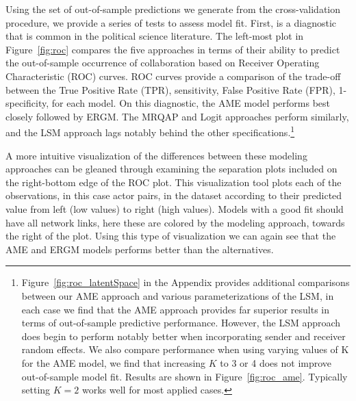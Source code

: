 \documentclass[12pt,pdflatex]{elsarticle}
\begin{document}
Using the set of out-of-sample predictions we generate from the cross-validation procedure, we provide a series of tests to assess model fit. First, is a diagnostic that is common in the political science literature. The left-most plot in Figure~\ref{fig:roc} compares the five approaches in terms of their ability to predict the out-of-sample occurrence of collaboration based on Receiver Operating Characteristic (ROC) curves. ROC curves provide a comparison of the trade-off between the True Positive Rate (TPR), sensitivity, False Positive Rate (FPR), 1-specificity, for each model. %
On this diagnostic, the AME model performs best closely followed by ERGM. The MRQAP and Logit approaches perform similarly, and the LSM approach lags notably behind the other specifications.\footnote{Figure~\ref{fig:roc_latentSpace} in the Appendix provides additional comparisons between our AME approach and various parameterizations of the LSM, in each case we find that the AME approach provides far superior results in terms of out-of-sample predictive performance. However, the LSM approach does begin to perform notably better when incorporating sender and receiver random effects. We also compare performance when using varying values of K for the AME model, we find that increasing $K$ to 3 or 4 does not improve out-of-sample model fit. Results are shown in Figure~\ref{fig:roc_ame}. Typically setting $K=2$ works well for most applied cases.} 

A more intuitive visualization of the differences between these modeling approaches can be gleaned through examining the separation plots included on the right-bottom edge of the ROC plot. This visualization tool plots each of the observations, in this case actor pairs, in the dataset according to their predicted value from left (low values) to right (high values). Models with a good fit should have all network links, here these are colored by the modeling approach, towards the right of the plot. Using this type of visualization we can again see that the AME and ERGM models performs better than the alternatives.
\end{document}
